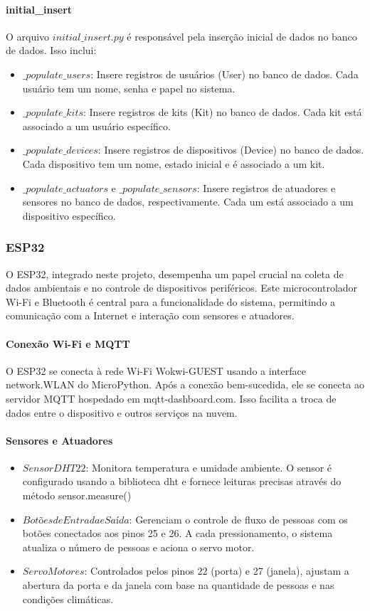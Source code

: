 \documentclass[conference, a4paper, 12pt]{IEEEtran}
\begin{document}
\paragraph{initial\_insert}
O arquivo $initial\_insert.py$ é responsável pela inserção inicial de dados no banco de dados. Isso inclui:
\begin{itemize}
    \item $\_populate\_users$: Insere registros de usuários (User) no banco de dados. Cada usuário tem um nome, senha e papel no sistema.
    \item $\_populate\_kits$: Insere registros de kits (Kit) no banco de dados. Cada kit está associado a um usuário específico.
    \item $\_populate\_devices$: Insere registros de dispositivos (Device) no banco de dados. Cada dispositivo tem um nome, estado inicial e é associado a um kit.
    \item $\_populate\_actuators$ e $\_populate\_sensors$: Insere registros de atuadores e sensores no banco de dados, respectivamente. Cada um está associado a um dispositivo específico.
\end{itemize}
\subsubsection{ESP32}
O ESP32, integrado neste projeto, desempenha um papel crucial na coleta de dados ambientais e no controle de dispositivos periféricos. Este microcontrolador Wi-Fi e Bluetooth é central para a funcionalidade do sistema, permitindo a comunicação com a Internet e interação com sensores e atuadores.

\paragraph{Conexão Wi-Fi e MQTT}
O ESP32 se conecta à rede Wi-Fi Wokwi-GUEST usando a interface network.WLAN do MicroPython. Após a conexão bem-sucedida, ele se conecta ao servidor MQTT hospedado em mqtt-dashboard.com. Isso facilita a troca de dados entre o dispositivo e outros serviços na nuvem.

\paragraph{Sensores e Atuadores}
\begin{itemize}
\item $Sensor DHT22$: Monitora temperatura e umidade ambiente. O sensor é configurado usando a biblioteca dht e fornece leituras precisas através do método sensor.measure()
\item $Botões de Entrada e Saída$: Gerenciam o controle de fluxo de pessoas com os botões conectados aos pinos 25 e 26. A cada pressionamento, o sistema atualiza o número de pessoas e aciona o servo motor.
\item $Servo Motores$: Controlados pelos pinos 22 (porta) e 27 (janela), ajustam a abertura da porta e da janela com base na quantidade de pessoas e nas condições climáticas.
\end{itemize}
\end{document}
